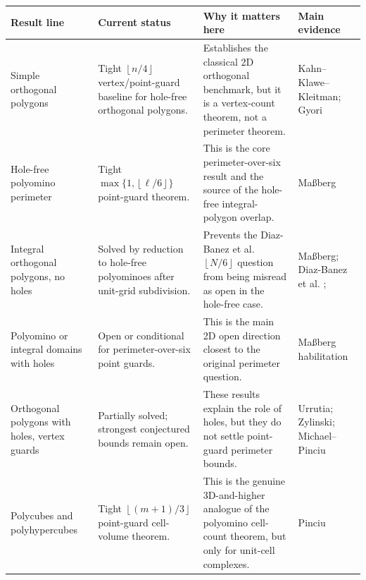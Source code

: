 \documentclass[11pt]{article}
\newcommand{\floor}[1]{\left\lfloor #1 \right\rfloor}
\begin{document}
\begin{table}[htbp]
\small
\setlength{\tabcolsep}{4pt}
\renewcommand{\arraystretch}{1.18}
\begin{tabularx}{\textwidth}{
  >{\raggedright\arraybackslash}p{}
  >{\raggedright\arraybackslash}p{}
  Y
  >{\raggedright\arraybackslash}p{0.18\textwidth}}
\toprule
Result line & Current status & Why it matters here & Main evidence \\
\midrule
Simple orthogonal polygons & Tight $\floor{n/4}$ vertex/point-guard baseline
for hole-free orthogonal polygons. & Establishes the classical 2D orthogonal
benchmark, but it is a vertex-count theorem, not a perimeter theorem. &
Kahn--Klawe--Kleitman; Gyori
\cite{KahnKlaweKleitman1983,Gyori1986} \\

Hole-free polyomino perimeter & Tight
$\max\{1,\floor{\ell/6}\}$ point-guard theorem. & This is the core
perimeter-over-six result and the source of the hole-free integral-polygon
overlap. & Ma{\ss}berg \cite[Theorem~1]{Massberg2014} \\

Integral orthogonal polygons, no holes & Solved by reduction to hole-free
polyominoes after unit-grid subdivision. & Prevents the Diaz-Banez et al.
$\floor{N/6}$ question from being misread as open in the hole-free case. &
Ma{\ss}berg; Diaz-Banez et al.
\cite[Theorem~1]{Massberg2014}; \cite{DiazBanezEtAl2025} \\

Polyomino or integral domains with holes & Open or conditional for
perimeter-over-six point guards. & This is the main 2D open direction closest
to the original perimeter question. & Ma{\ss}berg habilitation
\cite[Conj.~6.10]{MassbergHabilitation} \\

Orthogonal polygons with holes, vertex guards & Partially solved; strongest
conjectured bounds remain open. & These results explain the role of holes, but
they do not settle point-guard perimeter bounds. & Urrutia; Zylinski;
Michael--Pinciu
\cite{UrrutiaOpenProblems,Zylinski2006,MichaelPinciu2016} \\

Polycubes and polyhypercubes & Tight $\floor{(m+1)/3}$ point-guard
cell-volume theorem. & This is the genuine 3D-and-higher analogue of the
polyomino cell-count theorem, but only for unit-cell complexes. & Pinciu
\cite{Pinciu2015} \\


\end{tabularx}
\end{table}
\end{document}
